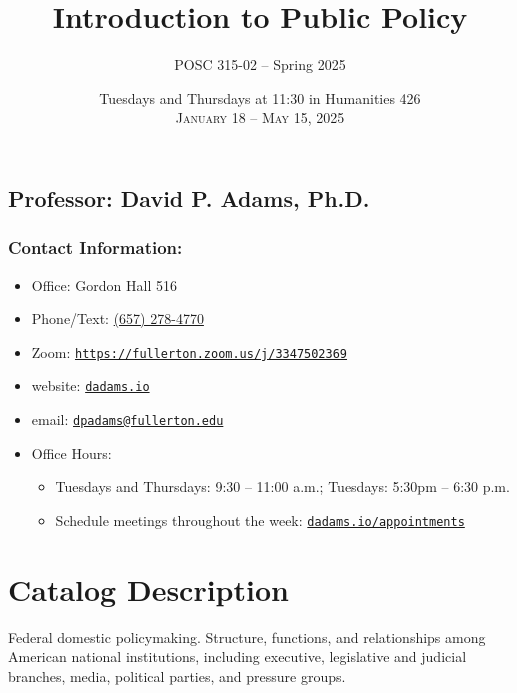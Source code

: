 \documentclass[11pt, letterpaper]{article}
\begin{document}
\title{\textbf{Introduction to Public Policy}}
\author{POSC 315-02 -- Spring 2025}
\date{Tuesdays and Thursdays at 11:30 in Humanities 426 \\\vspace{2ex} \textsc{January 18 -- May 15, 2025}}

    \maketitle


\subsection*{Professor: David P. Adams, Ph.D.}

\subsubsection*{Contact Information:}

\begin{itemize}
	\item Office: Gordon Hall 516
	\item Phone/Text: \href{tel:+16572784770}{(657) 278-4770}
	\item Zoom: \href{https://fullerton.zoom.us/j/3347502369}{\texttt{https://fullerton.zoom.us/j/3347502369}}
	\item website: \href{https://dadams.io}{\texttt{dadams.io}}
	\item email: \href{dpadams@fullerton.edu}{\texttt{dpadams@fullerton.edu}}
	\item Office Hours:
        \begin{itemize}
            \item Tuesdays and Thursdays: 9:30 -- 11:00 a.m.; Tuesdays: 5:30pm -- 6:30 p.m.
            \item Schedule meetings throughout the week: \href{https://dadams.io/appointments}{\texttt{dadams.io/appointments}}
        \end{itemize}  
\end{itemize}


\section{Catalog Description}

	Federal domestic policymaking. Structure, functions, and relationships among American national institutions, including executive, legislative and judicial branches, media, political parties, and pressure groups.
\end{document}
